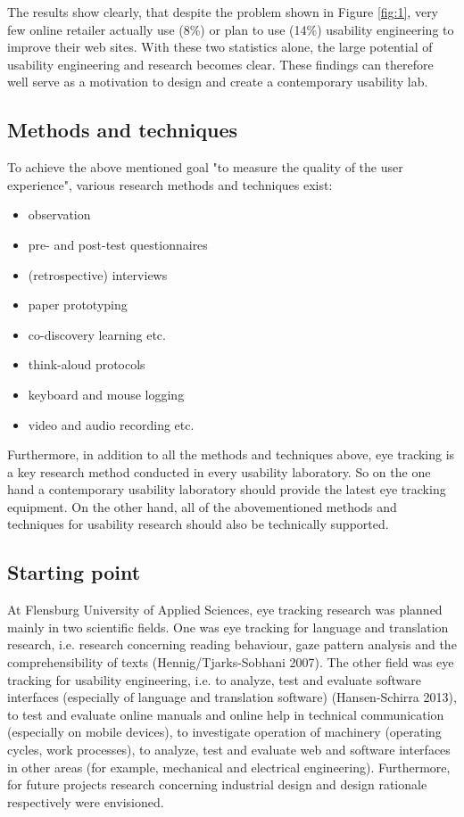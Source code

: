 \documentclass[output=paper]{langsci/langscibook}
\begin{document}
The results show clearly, that despite the problem shown in Figure \ref{fig:1}, very few online retailer actually use (8\%) or plan to use (14\%) usability engineering to improve their web sites. With these two statistics alone, the large potential of usability engineering and research becomes clear. These findings can therefore well serve as a motivation to design and create a contemporary usability lab.

\subsection{Methods and techniques}

To achieve the above mentioned goal "to measure the quality of the user experience", various research methods and techniques exist:

\begin{itemize}
\item observation
\item pre- and post-test questionnaires 
\item (retrospective) interviews 
\item paper prototyping 
\item co-discovery learning etc.
\item think-aloud protocols 
\item keyboard and mouse logging 
\item video and audio recording etc. 
\end{itemize}

Furthermore, in addition to all the methods and techniques above, eye tracking is a key research method conducted in every usability laboratory. So on the one hand a contemporary usability laboratory should provide the latest eye tracking equipment. On the other hand, all of the abovementioned methods and techniques for usability research should also be technically supported.

\subsection{Starting point}

At Flensburg University of Applied Sciences, eye tracking research was planned mainly in two scientific fields. One was eye tracking for language and translation research, i.e. research concerning reading behaviour, gaze pattern analysis and the comprehensibility of texts (Hennig/Tjarks-Sobhani 2007). The other field was eye tracking for usability engineering, i.e. to analyze, test and evaluate software interfaces (especially of language and translation software) (Hansen-Schirra 2013), to test and evaluate online manuals and online help in technical communication (especially on mobile devices), to investigate operation of machinery (operating cycles, work processes), to analyze, test and evaluate web and software interfaces in other areas (for example, mechanical and electrical engineering). Furthermore, for future projects research concerning industrial design and design rationale respectively were envisioned.
\end{document}

